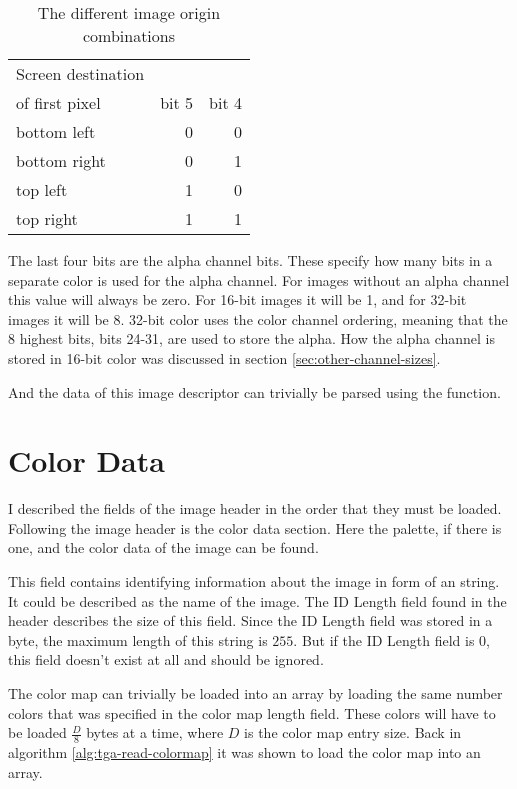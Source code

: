 \begin{table}
  \centering
  \begin{tabular}{lrr}
    \toprule
    Screen destination \\ of first pixel & bit 5 & bit 4 \\
    \midrule
    bottom left & 0 & 0 \\
    bottom right & 0 & 1 \\
    top left & 1 & 0 \\
    top right & 1 & 1 \\
    \bottomrule
  \end{tabular}
  \caption{The different image origin combinations}
  \label{tab:image-origin}
\end{table}

The last four bits are the alpha channel bits. These specify how many
bits in a separate color is used for the alpha channel. For images
without an alpha channel this value will always be zero. For 16-bit
images it will be 1, and for 32-bit images it will be 8. 32-bit color
uses the \argb color channel ordering, meaning that the 8 highest bits,
bits 24-31, are used to store the alpha. How the alpha channel is
stored in 16-bit color was discussed in section
\ref{sec:other-channel-sizes}.

And the data of this image descriptor can trivially be parsed using
the  function.

\section{Color Data}
\label{sec:color-data}

I described the fields of the image header in the order that they must
be loaded. Following the image header is the color data section. Here
the palette, if there is one, and the color data of the image can be
found.


This field contains identifying information about the image in form of
an \ascii string. It could be described as the name of the image. The
ID Length field found in the header describes the size of this
field. Since the ID Length field was stored in a byte, the maximum
length of this string is $255$. But if the ID Length field is 0, this field
doesn't exist at all and should be ignored.


The color map can trivially be loaded into an array by loading the
same number colors that was specified in the color map length field. These
colors will have to be loaded $\frac{D}{8}$ bytes at a time, where $D$
is the color map entry size. Back in algorithm
\ref{alg:tga-read-colormap} it was shown to load the color map into an
array.

